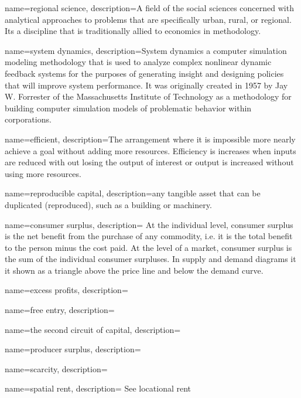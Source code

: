 {
name=regional science,
description={A field of the social sciences concerned with analytical approaches to problems that are specifically urban, rural, or regional. Its a discipline that is traditionally allied to economics in methodology.}
}

{
name=system dynamics,
description={System dynamics a computer simulation modeling methodology that is used to analyze complex nonlinear dynamic feedback systems for the purposes of generating insight and designing policies that will improve system performance. It was originally created in 1957 by Jay W. Forrester of the Massachusetts Institute of Technology as a methodology for building computer simulation models of problematic behavior within corporations.}
}

{
name=efficient,
description={The arrangement where it is impossible more nearly achieve a goal without adding more resources. Efficiency is increases when inputs are reduced with out losing the output of interest or output is increased without using more resources.}
}

{
name=reproducible capital,
description={any tangible asset that can be duplicated (reproduced), such as a building or machinery.}
}


{
name=consumer surplus,
description={%
At the individual level, consumer surplus is the net benefit from the purchase of any commodity, i.e. it is the total benefit to the person minus the cost paid. At the level of a market, consumer surplus is the sum of the individual consumer surpluses. In supply and demand diagrams it it shown as a triangle above the price line and below the demand curve.}
}

{
name=excess profits,
description={}
}

{
name=free entry,
description={}
}

{
name=the second circuit of capital,
description={}
}

{
name=producer surplus,
description={}
}

{
name=scarcity,
description={}
}

{
name=spatial rent,
description={ See \gls{locational rent}}
}

